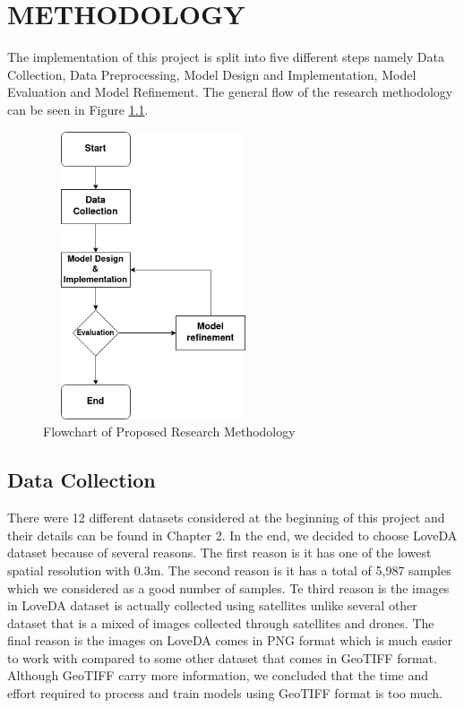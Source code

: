 \chapter{METHODOLOGY}

The implementation of this project is split into five different steps namely Data Collection, Data Preprocessing, Model Design and Implementation, Model Evaluation and Model Refinement. The general flow of the research methodology can be seen in Figure \ref{fig:flowchart1}.

\FloatBarrier
\begin{figure}[!h]
\includegraphics[width=6.5cm, height=8.5cm]{images/flowchart1.png}
\centering
\caption{Flowchart of Proposed Research Methodology}
\label{fig:flowchart1}
\end{figure}
\FloatBarrier

\section{Data Collection}

There were 12 different datasets considered at the beginning of this project and their details can be found in Chapter 2. In the end, we decided to choose LoveDA dataset \cite{loveda} because of several reasons. The first reason is it has one of the lowest spatial resolution with 0.3m. The second reason is it has a total of 5,987 samples which we considered as a good number of samples. Te third reason is the images in LoveDA dataset is actually collected using satellites unlike several other dataset that is a mixed of images collected through satellites and drones. The final reason is the images on LoveDA comes in PNG format which is much easier to work with compared to some other dataset that comes in GeoTIFF format. Although GeoTIFF carry more information, we concluded that the time and effort required to process and train models using GeoTIFF format is too much.

